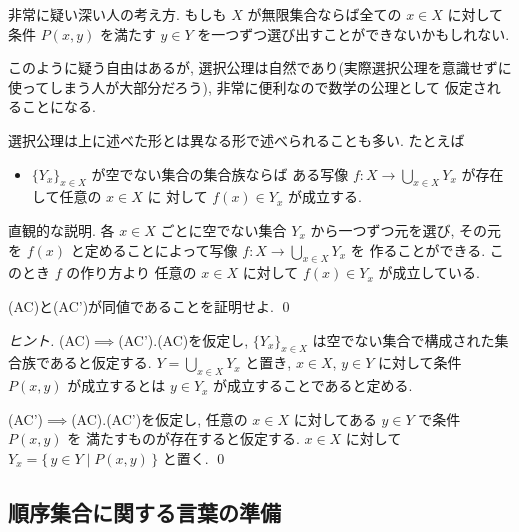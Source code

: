 \documentclass[12pt,twoside]{jarticle}
\begin{document}
非常に疑い深い人の考え方. もしも $X$ が無限集合ならば全ての $x\in X$ に対して
条件 $P(x,y)$ を満たす $y\in Y$ を一つずつ選び出すことができないかもしれない.

このように疑う自由はあるが, 選択公理は自然であり(実際選択公理を意識せずに
使ってしまう人が大部分だろう), 非常に便利なので数学の公理として
仮定されることになる.

選択公理は上に述べた形とは異なる形で述べられることも多い. たとえば
\begin{itemize}
\item[(AC')] $\{Y_x\}_{x\in X}$ が空でない集合の集合族ならば
  ある写像 $f:X\to \bigcup_{x\in X}Y_x$ が存在して任意の $x\in X$ に
  対して $f(x)\in Y_x$ が成立する.
\end{itemize}
直観的な説明. 各 $x\in X$ ごとに空でない集合 $Y_x$ から一つずつ元を選び,
その元を $f(x)$ と定めることによって写像 $f:X\to \bigcup_{x\in X}Y_x$ を
作ることができる. このとき $f$ の作り方より
任意の $x\in X$ に対して $f(x)\in Y_x$ が成立している.

\begin{question}[5点]
  (AC)と(AC')が同値であることを証明せよ. \qed
\end{question}

\begin{proof}[ヒント]
  (AC)$\implies$(AC').\enspace (AC)を仮定し, 
  $\{Y_x\}_{x\in X}$ は空でない集合で構成された集合族であると仮定する.
  $Y=\bigcup_{x\in X} Y_x$ と置き, 
  $x\in X$, $y\in Y$ に対して条件 $P(x,y)$ が成立するとは
  $y\in Y_x$ が成立することであると定める.

  (AC')$\implies$(AC).\enspace (AC')を仮定し, 
  任意の $x\in X$ に対してある $y\in Y$ で条件 $P(x,y)$ を
  満たすものが存在すると仮定する.
  $x\in X$ に対して $Y_x=\{\,y\in Y\mid P(x,y)\,\}$ と置く.
  \qed
\end{proof}


\subsection{順序集合に関する言葉の準備}
\end{document}
